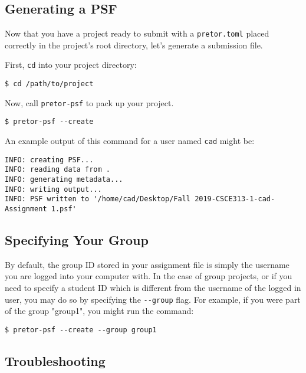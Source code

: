 \documentclass{article}
\begin{document}
\subsection{Generating a PSF}


Now that you have a project ready to submit with a \texttt{pretor.toml} placed
correctly in the project's root directory, let's generate a submission file.


First, \texttt{cd} into your project directory:

\texttt{\$ cd /path/to/project}

Now, call \texttt{pretor-psf} to pack up your project.

\texttt{\$ pretor-psf -{}-create}

An example output of this command for a user named \texttt{cad} might be:

\begin{verbatim}
INFO: creating PSF...
INFO: reading data from .
INFO: generating metadata...
INFO: writing output...
INFO: PSF written to '/home/cad/Desktop/Fall 2019-CSCE313-1-cad-Assignment 1.psf'
\end{verbatim}

\subsection{Specifying Your Group}

By default, the group ID stored in your assignment file is simply the username
you are logged into your computer with.  In the case of group projects, or if
you need to specify a student ID which is different from the username of the
logged in user, you may do so by specifying the \texttt{-{}-group} flag. For
example, if you were part of the group "group1", you might run the command:

\texttt{\$ pretor-psf -{}-create -{}-group group1}


\subsection{Troubleshooting}
\end{document}
